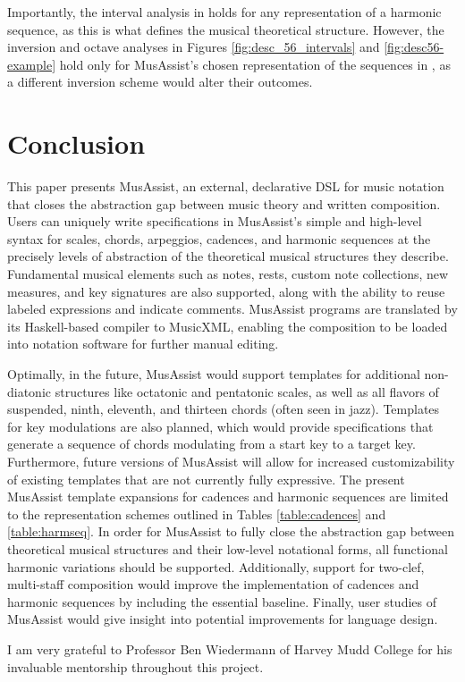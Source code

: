 \documentclass{article}
\begin{document}
Importantly, the interval analysis in  holds for any representation of a harmonic sequence, as this is what defines the musical theoretical structure. However, the inversion and octave analyses in Figures \ref{fig:desc_56_intervals} and \ref{fig:desc56-example} hold only for MusAssist’s chosen representation of the sequences in , as a different inversion scheme would alter their outcomes.


\section{Conclusion}
This paper presents MusAssist, an external, declarative DSL for music notation that closes the abstraction gap between music theory and written composition. Users can uniquely write specifications in MusAssist’s simple and high-level syntax for scales, chords, arpeggios, cadences, and harmonic sequences at the precisely levels of abstraction of the theoretical musical structures they describe. Fundamental musical elements such as notes, rests, custom note collections, new measures, and key signatures are also supported, along with the ability to reuse labeled expressions and indicate comments. MusAssist programs are translated by its Haskell-based compiler to MusicXML, enabling the composition to be loaded into notation software for further manual editing.


Optimally, in the future, MusAssist would support templates for additional non-diatonic structures like octatonic and pentatonic scales, as well as all flavors of suspended, ninth, eleventh, and thirteen chords (often seen in jazz). Templates for key modulations are also planned, which would provide specifications that generate a sequence of chords modulating from a start key to a target key. Furthermore, future versions of MusAssist will allow for increased customizability of existing templates that are not currently fully expressive. The present MusAssist template expansions for cadences and harmonic sequences are limited to the representation schemes outlined in Tables \ref{table:cadences} and \ref{table:harmseq}. In order for MusAssist to fully close the abstraction gap between theoretical musical structures and their low-level notational forms, all functional harmonic variations should be supported. Additionally, support for two-clef, multi-staff composition would improve the implementation of cadences and harmonic sequences by including the essential baseline. Finally, user studies of MusAssist would give insight into potential improvements for language design.

\begin{acknowledgments}
I am very grateful to Professor Ben Wiedermann of Harvey Mudd College for his invaluable mentorship throughout this project.
\end{acknowledgments} 


\end{document}
